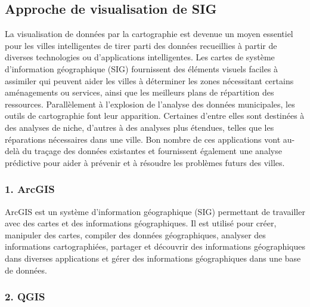 \documentclass[french, a4paper, 12pt]{report}
\begin{document}
\subsection{Approche de visualisation de SIG}
La visualisation de données par la cartographie est devenue un moyen essentiel pour les villes intelligentes de tirer parti des données recueillies à partir de diverses technologies ou d’applications intelligentes. Les cartes de système d'information géographique (SIG) fournissent des éléments visuels faciles à assimiler qui peuvent aider les villes à déterminer les zones nécessitant certains aménagements ou services, ainsi que les meilleurs plans de répartition des ressources.
Parallèlement à l'explosion de l'analyse des données municipales, les outils de cartographie font leur apparition. Certaines d'entre elles sont destinées à des analyses de niche, d'autres à des analyses plus étendues, telles que les réparations nécessaires dans une ville. Bon nombre de ces applications vont au-delà du traçage des données existantes et fournissent également une analyse prédictive pour aider à prévenir et à résoudre les problèmes futurs des villes.
\subsubsection{1. ArcGIS}

ArcGIS est un système d'information géographique (SIG) permettant de travailler avec des cartes et des informations géographiques. Il est utilisé pour créer, manipuler des cartes, compiler des données géographiques, analyser des informations cartographiées, partager et découvrir des informations géographiques dans diverses applications et gérer des informations géographiques dans une base de données.








\subsubsection{2. QGIS}
\end{document}
